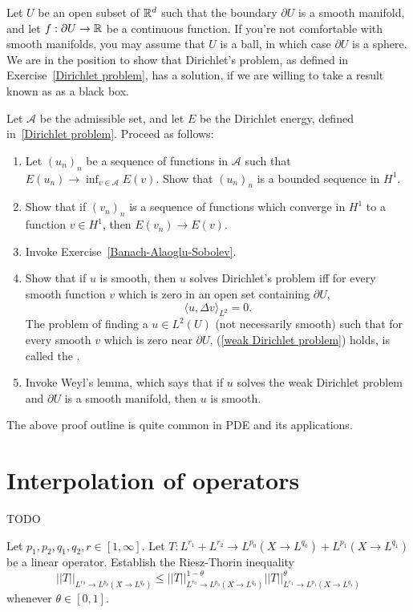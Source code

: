 \begin{exercise}\label{Dirichlet problem 2}
Let $U$ be an open subset of $\mathbb{R}^d$ such that the boundary $\partial U$ is a smooth manifold, and let $f: \partial U \to \mathbb{R}$ be a continuous function.
If you're not comfortable with smooth manifolds, you may assume that $U$ is a ball, in which case $\partial U$ is a sphere.
We are in the position to show that Dirichlet's problem, as defined in Exercise~\ref{Dirichlet problem}, has a solution, if we are willing to take a result known as  as a black box.

Let $\mathcal A$ be the admissible set, and let $E$ be the Dirichlet energy, defined in~\ref{Dirichlet problem}.
Proceed as follows:
\begin{enumerate}
\item Let $(u_{n})_{n}$ be a sequence of functions in $\mathcal A$ such that $E(u_{n}) \to \inf_{v \in \mathcal A} E(v)$.
Show that $(u_{n})_{n}$ is a bounded sequence in $H^1$.
\item Show that if $(v_{n})_{n}$ is a sequence of functions which converge in $H^1$ to a function $v \in H^1$, then $E(v_{n}) \to E(v)$.
\item Invoke Exercise~\ref{Banach-Alaoglu-Sobolev}.
\item Show that if $u$ is smooth, then $u$ solves Dirichlet's problem iff for every smooth function $v$ which is zero in an open set containing $\partial U$,
\begin{equation}\label{weak Dirichlet problem}
\langle u, \Delta v\rangle_{L^2} = 0.
\end{equation}
The problem of finding a $u \in L^2(U)$ (not necessarily smooth) such that for every smooth $v$ which is zero near $\partial U$, (\ref{weak Dirichlet problem}) holds, is called the .
\item Invoke Weyl's lemma, which says that if $u$ solves the weak Dirichlet problem and $\partial U$ is a smooth manifold, then $u$ is smooth.
\end{enumerate}
The above proof outline is quite common in PDE and its applications.
\end{exercise}


\section{Interpolation of operators}
TODO

\begin{exercise}
Let $p_1,p_2,q_1,q_2,r \in [1, \infty]$. Let $T: L^{r_1} + L^{r_2} \to L^{p_0}(X \to L^{q_0}) + L^{p_1}(X \to L^{q_1})$ be a linear operator.
Establish the Riesz-Thorin inequality
\[||T||_{L^{r_\theta} \to L^{p_\theta}(X \to L^{q_\theta})} \leq ||T||_{L^{r_0} \to L^{p_0}(X \to L^{q_0})}^{1 - \theta} ||T||_{L^{r_1} \to L^{p_1}(X \to L^{q_1})}^\theta\]
whenever $\theta \in [0, 1]$.
\end{exercise}

